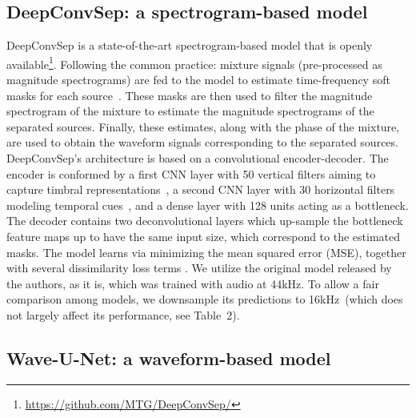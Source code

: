 \documentclass[a4paper]{article}
\begin{document}
\vspace{-2mm}
\subsection{DeepConvSep: a spectrogram-based model}


DeepConvSep \cite{chandna2017monoaural} is a state-of-the-art spectrogram-based model that is openly available\footnote{\href{https://github.com/MTG/DeepConvSep}{https://github.com/MTG/DeepConvSep/}}. Following the common practice: mixture signals (pre-processed as magnitude spectrograms) are fed to the model to estimate time-frequency soft masks for each source~\cite{stoter20182018,jansson2017singing,huang2014singing}. These masks are then used to filter the magnitude spectrogram of the mixture to estimate the magnitude spectrograms of the separated sources. Finally, these estimates, along with the phase of the mixture, are used to obtain the waveform signals corresponding to the separated sources.
DeepConvSep's architecture is based on a convolutional encoder-decoder. The encoder is conformed by a first CNN layer with 50 vertical filters aiming to capture timbral representations~\cite{pons2017timbre}, a second CNN layer with 30 horizontal filters modeling temporal cues~\cite{pons2017designing}, and a dense layer with 128 units acting as a bottleneck. The decoder contains two deconvolutional layers which up-sample the bottleneck feature maps up to have the same input size, which correspond to the estimated masks. The model learns via minimizing the mean squared error (MSE), together with several dissimilarity loss terms \cite{chandna2017monoaural,huang2014singing}. We utilize the original model released by the authors, as it is, which was trained with audio at 44kHz. To allow a fair comparison among models, we downsample its predictions to 16kHz~(which does not largely affect its performance, see Table~2).

\vspace{-2mm}
\subsection{Wave-U-Net: a waveform-based model}
\end{document}
